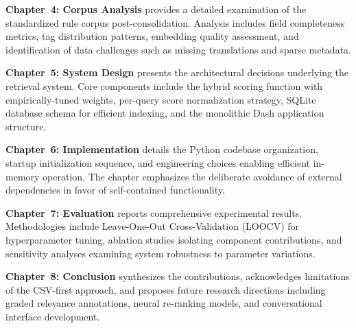 \textbf{Chapter~4: Corpus Analysis} provides a detailed examination of the standardized rule corpus post-consolidation. Analysis includes field completeness metrics, tag distribution patterns, embedding quality assessment, and identification of data challenges such as missing translations and sparse metadata.

\textbf{Chapter~5: System Design} presents the architectural decisions underlying the retrieval system. Core components include the hybrid scoring function with empirically-tuned weights, per-query score normalization strategy, SQLite database schema for efficient indexing, and the monolithic Dash application structure.

\textbf{Chapter~6: Implementation} details the Python codebase organization, startup initialization sequence, and engineering choices enabling efficient in-memory operation. The chapter emphasizes the deliberate avoidance of external dependencies in favor of self-contained functionality.

\textbf{Chapter~7: Evaluation} reports comprehensive experimental results. Methodologies include Leave-One-Out Cross-Validation (LOOCV) for hyperparameter tuning, ablation studies isolating component contributions, and sensitivity analyses examining system robustness to parameter variations.

\textbf{Chapter~8: Conclusion} synthesizes the contributions, acknowledges limitations of the CSV-first approach, and proposes future research directions including graded relevance annotations, neural re-ranking models, and conversational interface development.
